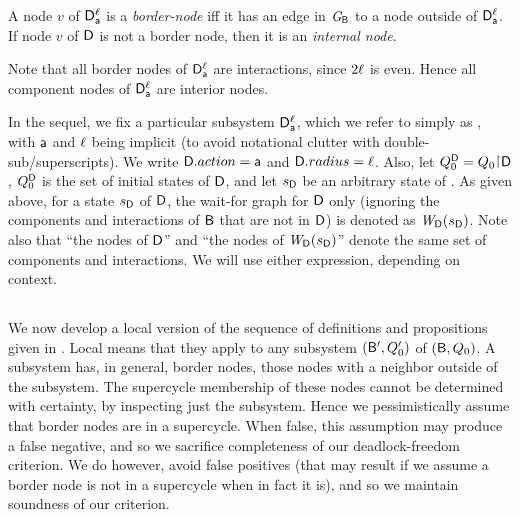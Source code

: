 \begin{definition}  \label{def:dsk.border-and internal}
A node $v$ of $\mathsf{D}_{\mathsf{a}}^{\ell}$ is a \emph{border-node} iff it has an
edge in $\mathit{G}_{\mathsf{B}}$ to a node outside of $\mathsf{D}_{\mathsf{a}}^{\ell}$.
If node $v$ of $\mathsf{D}$ is not a border node, then it is an \emph{internal node}.
\end{definition}
Note that all border nodes of  $\mathsf{D}_{\mathsf{a}}^{\ell}$ are interactions,
since $2\ell$ is even. Hence all component nodes of $\mathsf{D}_{\mathsf{a}}^{\ell}$ are
interior nodes.



In the sequel, we fix a particular subsystem $\mathsf{D}_{\mathsf{a}}^{\ell}$, which
we refer to simply as \DS, with $\mathsf{a}$ and $\ell$ being implicit (to
avoid notational clutter with double-sub/superscripts). 
We write $\mathsf{D}.action = \mathsf{a}$ and $\mathsf{D}.radius = \ell$. 
Also, let $\QDS = Q_0 \pj \DS$, \ie $Q_0^{\mathsf{D}}$ is the set of initial states of $\mathsf{D}$, and
let $s_\mathsf{D}$ be an arbitrary state of \DS.
%
As given above, for a state $s_\mathsf{D}$ of $\mathsf{D}$, the wait-for graph for $\mathsf{D}$ only (\ie ignoring the components and interactions of $\mathsf{B}$ that are not in
$\mathsf{D}$) is denoted as $\mathit{W}_{\mathsf{D}}({s_\mathsf{D}})$.
%
Note also that ``the nodes of $\mathsf{D}$'' and ``the nodes of $\mathit{W}_{\mathsf{D}}({s_\mathsf{D}})$'' denote the same set of components and interactions. 
We will use either expression, depending on context.


%
\subsection{}
\label{s:local.fixpoint}

We now develop a local version of the sequence of definitions and propositions given in .  Local means that they apply to any
subsystem $(\mathsf{B}', Q'_0)$ of $(\mathsf{B}, Q_0)$. A subsystem has, in general, border nodes, \ie those nodes with a neighbor outside of the
subsystem. The supercycle membership of these nodes cannot be determined with certainty, by inspecting just the subsystem.
Hence we pessimistically assume that border nodes are in a supercycle. When false, this assumption may produce a false negative, and so we sacrifice
completeness of our deadlock-freedom criterion. We do however, avoid false positives (that may result if we assume a border node is not in a supercycle when in fact it
is), and so we maintain soundness of our criterion. 


